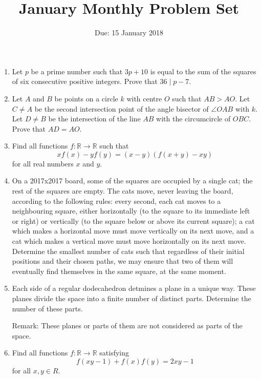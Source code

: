 \documentclass[12pt]{article}
\title{January Monthly Problem Set}
\author{Due: 15 January 2018}
\date{}
\begin{document}
 \maketitle

\begin{enumerate}

\item %
  Let $p$ be a prime number such that $3p+10$ is equal to the sum of the squares of six consecutive positive integers. Prove that $36 \mid p-7$.

 
\item %
Let $A$ and $B$ be points on a circle $k$ with centre $O$ such that $AB > AO$. Let $C \neq A$ be the second intersection point of the angle bisector of $\angle OAB$ with $k$. Let $D \neq B$ be the intersection of the line $AB$ with the circumcircle of $OBC$. Prove that $AD = AO$.


\item %
Find all functions $f : \mathbb{R} \to \mathbb{R}$ such that
  \[ xf(x) - yf(y) = (x - y)(f(x + y) - xy) \]
for all real numbers $x$ and $y$.


\item %
On a 2017x2017 board, some of the squares are occupied by a single cat; the rest of the squares are empty. The cats move, never leaving the board, according to the following rules: every second, each cat moves to a neighbouring square, either horizontally (to the square to its immediate left or right) or vertically (to the square below or above its current square); a cat which makes a horizontal move must move vertically on its next move, and a cat which makes a vertical move must move horizontally on its next move. Determine the smallest number of cats such that regardless of their initial positions and their chosen paths, we may ensure that two of them will eventually find themselves in the same square, at the same moment.


\item %
Each side of a regular dodecahedron detmines a plane in a unique way. These planes divide the space into a finite number of distinct parts. Determine the number of these parts.

\small{Remark: These planes or parts of them are not considered as parts of the space.}


\item %
Find all functions $f: \mathbb{R} \to \mathbb{R}$ satisfying
  \[ f(xy-1) + f(x)f(y) = 2xy-1 \]
for all $x,y\in R$.



\end{enumerate}
\end{document}
